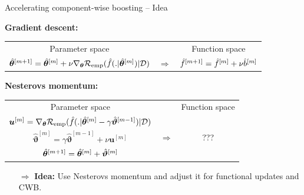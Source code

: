 \documentclass[t,10pt]{beamer}
\begin{document}
\begin{frame}{Accelerating component-wise boosting -- Idea}

  \textbf{Gradient descent:}

  \vspace{0.2cm}
  {\small
  \begin{tabular}{ccc}
    Parameter space & & Function space \\[0.3cm]
    $\hat{\bm{\theta}}^{[m+1]} = \hat{\bm{\theta}}^{[m]} + \nu \nabla_{\bm{\theta}}\mathcal{R}_{\text{emp}}(\hat{f}(. | \hat{\bm{\theta}}^{[m]}) | \mathcal{D})$ & $\Rightarrow$ & $\hat{f}^{[m+1]} = \hat{f}^{[m]} + \nu \hat{b}^{[m]}$
  \end{tabular}}
  \vspace{0.4cm}

  \textbf{Nesterovs momentum:}

  \vspace{0.2cm}
  {\small
  \begin{tabular}{ccc}
    Parameter space & & Function space \\[0.3cm]
    $\bm{u}^{[m]} = \nabla_{\bm{\theta}}\mathcal{R}_{\text{emp}}(\hat{f}(. | \hat{\bm{\theta}}^{[m]} - \gamma \hat{\bm{\vartheta}}^{[m-1]}) | \mathcal{D})$ &  & \\
    $\hat{\bm{\vartheta}}^{[m]} = \gamma \hat{\bm{\vartheta}}^{[m-1]} + \nu \bm{u}^{[m]}$ & $\Rightarrow$ & ??? \\
    $\hat{\bm{\theta}}^{[m+1]} = \hat{\bm{\theta}}^{[m]} + \hat{\bm{\vartheta}}^{[m]}$ & &
  \end{tabular}}
  \vspace{0.2cm}

  \begin{itemize}
  \item[$\Rightarrow$] \textbf{Idea:} Use Nesterovs momentum and adjust it for functional updates and CWB.
  \end{itemize}

\end{frame}
\end{document}
